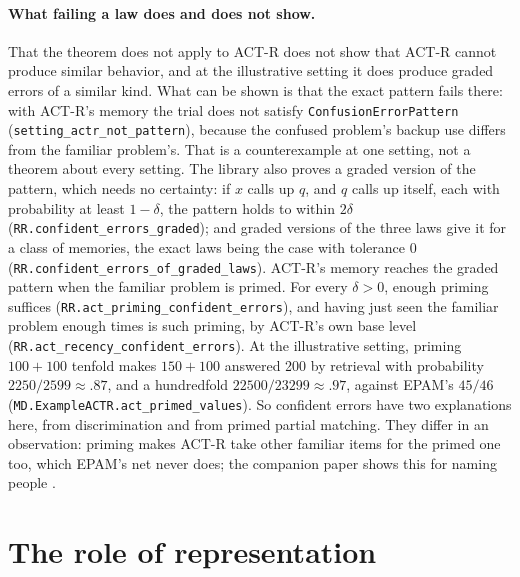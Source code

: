 \documentclass[11pt]{article}
\newcommand{\lean}[1]{\texttt{#1}}
\begin{document}
\paragraph{What failing a law does and does not show.} That the theorem does not apply to ACT-R does not show that ACT-R cannot produce similar behavior, and at the illustrative setting it does produce graded errors of a similar kind. What can be shown is that the exact pattern fails there: with ACT-R's memory the trial does not satisfy \lean{ConfusionErrorPattern} (\lean{setting\_actr\_not\_pattern}), because the confused problem's backup use differs from the familiar problem's. That is a counterexample at one setting, not a theorem about every setting. The library also proves a graded version of the pattern, which needs no certainty: if $x$ calls up $q$, and $q$ calls up itself, each with probability at least $1-\delta$, the pattern holds to within $2\delta$ (\lean{RR.confident\_errors\_graded}); and graded versions of the three laws give it for a class of memories, the exact laws being the case with tolerance 0 (\lean{RR.confident\_errors\_of\_graded\_laws}). ACT-R's memory reaches the graded pattern when the familiar problem is primed. For every $\delta > 0$, enough priming suffices (\lean{RR.act\_priming\_confident\_errors}), and having just seen the familiar problem enough times is such priming, by ACT-R's own base level (\lean{RR.act\_recency\_confident\_errors}). At the illustrative setting, priming $100+100$ tenfold makes $150+100$ answered 200 by retrieval with probability $2250/2599 \approx .87$, and a hundredfold $22500/23299 \approx .97$, against EPAM's $45/46$ (\lean{MD.ExampleACTR.act\_primed\_values}). So confident errors have two explanations here, from discrimination and from primed partial matching. They differ in an observation: priming makes ACT-R take other familiar items for the primed one too, which EPAM's net never does; the companion paper shows this for naming people \citep{shrager2026coglean}.

\section{The role of representation}
\label{sec:repr}
\end{document}

